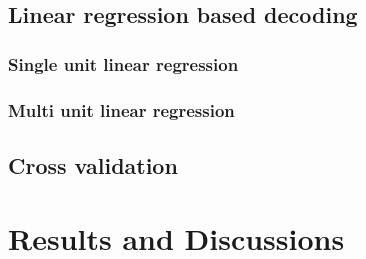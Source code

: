 \documentclass[a4,12pt]{ozu-thesis}
\begin{document}
\subsection{Linear regression based decoding}



\subsubsection{Single unit linear regression}


\subsubsection{Multi unit linear regression}


\subsection{Cross validation}



%

\section{Results and Discussions}

\end{document}
